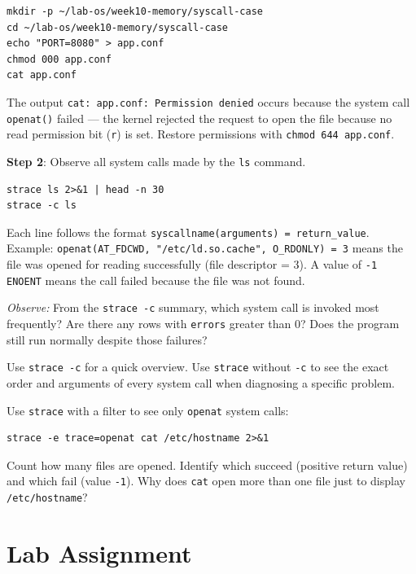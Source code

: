 \begin{lstlisting}[caption={Simulate a permission error}]
mkdir -p ~/lab-os/week10-memory/syscall-case
cd ~/lab-os/week10-memory/syscall-case
echo "PORT=8080" > app.conf
chmod 000 app.conf
cat app.conf
\end{lstlisting}

The output \texttt{cat: app.conf: Permission denied} occurs because the system call
\texttt{openat()} failed --- the kernel rejected the request to open the file
because no read permission bit (\texttt{r}) is set. Restore permissions with
\texttt{chmod 644 app.conf}.

\textbf{Step 2}: Observe all system calls made by the \texttt{ls} command.

\begin{lstlisting}[caption={Detailed and summary system calls}]
strace ls 2>&1 | head -n 30
strace -c ls
\end{lstlisting}

Each line follows the format \texttt{syscallname(arguments) = return\_value}.
Example: \texttt{openat(AT\_FDCWD, "/etc/ld.so.cache", O\_RDONLY) = 3} means the
file was opened for reading successfully (file descriptor = 3). A value of
\texttt{-1 ENOENT} means the call failed because the file was not found.

\textit{Observe:} From the \texttt{strace -c} summary, which system call is invoked
most frequently? Are there any rows with \texttt{errors} greater than 0? Does the
program still run normally despite those failures?

\begin{tipbox}
Use \texttt{strace -c} for a quick overview. Use \texttt{strace} without \texttt{-c}
to see the exact order and arguments of every system call when diagnosing a specific
problem.
\end{tipbox}

\begin{challengebox}
Use \texttt{strace} with a filter to see only \texttt{openat} system calls:
\begin{lstlisting}
strace -e trace=openat cat /etc/hostname 2>&1
\end{lstlisting}
Count how many files are opened. Identify which succeed (positive return value)
and which fail (value \texttt{-1}). Why does \texttt{cat} open more than one file
just to display \texttt{/etc/hostname}?
\end{challengebox}

\section{Lab Assignment}


